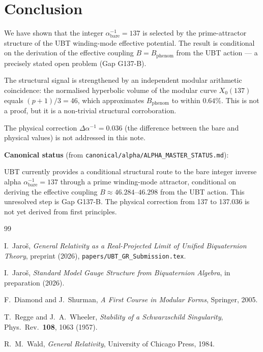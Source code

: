 \documentclass[12pt,a4paper]{article}
\theoremstyle{definition}
\theoremstyle{remark}
\begin{document}
\section{Conclusion}
\label{sec:conclusion}

We have shown that the integer $\alpha^{-1}_{\mathrm{bare}} = 137$ is selected
by the prime-attractor structure of the UBT winding-mode effective potential.
The result is conditional on the derivation of the effective coupling
$B = B_{\mathrm{phenom}}$ from the UBT action — a precisely stated open
problem (Gap G137-B).

The structural signal is strengthened by an independent modular arithmetic
coincidence: the normalised hyperbolic volume of the modular curve
$X_0(137)$ equals $(p+1)/3 = 46$, which approximates $B_{\mathrm{phenom}}$
to within $0.64\%$.  This is not a proof, but it is a non-trivial structural
corroboration.

The physical correction $\Delta\alpha^{-1} = 0.036$ (the difference between
the bare and physical values) is not addressed in this note.

\bigskip
\noindent\textbf{Canonical status} (from \texttt{canonical/alpha/ALPHA\_MASTER\_STATUS.md}):

\begin{tcolorbox}[colback=yellow!5!white,colframe=orange!60!black]
UBT currently provides a conditional structural route to the bare integer
inverse alpha $\alpha^{-1}_{\mathrm{bare}} = 137$ through a prime
winding-mode attractor, conditional on deriving the effective coupling
$B \approx 46.284$–$46.298$ from the UBT action.  This unresolved step
is Gap G137-B.  The physical correction from 137 to 137.036 is not yet
derived from first principles.
\end{tcolorbox}


\begin{thebibliography}{99}

I.\ Jaro\v{s},
\emph{General Relativity as a Real-Projected Limit of Unified Biquaternion Theory},
preprint (2026), \texttt{papers/UBT\_GR\_Submission.tex}.

I.\ Jaro\v{s},
\emph{Standard Model Gauge Structure from Biquaternion Algebra},
in preparation (2026).

F.\ Diamond and J.\ Shurman,
\emph{A First Course in Modular Forms},
Springer, 2005.

T.\ Regge and J.\ A.\ Wheeler,
\emph{Stability of a Schwarzschild Singularity},
Phys.\ Rev.\ \textbf{108}, 1063 (1957).

R.\ M.\ Wald, \emph{General Relativity}, University of Chicago Press, 1984.

\end{thebibliography}
\end{document}
